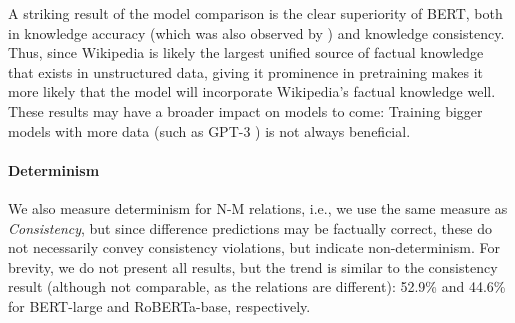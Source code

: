 A striking result of the model comparison is
the clear superiority of
BERT, both in knowledge accuracy (which was also observed by \citet{autoprompt}) and knowledge
consistency.  
Thus, since Wikipedia is likely the largest unified source of factual knowledge that exists in unstructured data, giving it prominence in pretraining  makes it more likely that the model will incorporate Wikipedia's factual knowledge well.
These results may have a broader impact on models to
come: Training bigger models with more data (such as GPT-3 \cite{gpt3}) is not always beneficial. 



\paragraph{Determinism}
We also measure determinism for N-M relations, i.e., we use
the same measure as \textit{Consistency}, but since difference predictions may be factually correct, these do not necessarily convey consistency violations, but indicate non-determinism. For brevity, we do not present all results, but the trend is similar to the consistency result (although not comparable, as the relations are different): 52.9\% and 44.6\% for BERT-large and RoBERTa-base, respectively.











